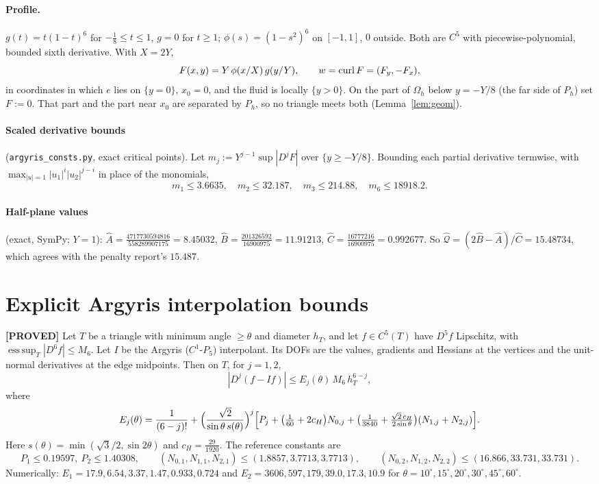 \documentclass[11pt]{article}
\theoremstyle{remark}\newtheorem{remark}[theorem]{Remark}
\newcommand{\Oh}{\Omega_h}\newcommand{\Gh}{\Gamma_h}\newcommand{\hG}{h_\Gamma}\newcommand{\dn}{\partial_n}
\newcommand{\lab}[1]{\textbf{[#1]}}
\begin{document}
\paragraph{Profile.} $g(t)=t(1-t)^6$ for $-\tfrac18\le t\le1$, $g=0$ for $t\ge1$; $\phi(s)=(1-s^2)^6$ on $[-1,1]$, $0$ outside.
Both are $C^5$ with piecewise-polynomial, bounded sixth derivative. With $X=2Y$,
\[F(x,y)=Y\,\phi(x/X)\,g(y/Y),\qquad w=\operatorname{curl} F=(F_y,-F_x),\]
in coordinates in which $e$ lies on $\{y=0\}$, $x_0=0$, and the fluid is locally $\{y>0\}$. On the part of $\Oh$ below
$y=-Y/8$ (the far side of $P_h$) set $F:=0$. That part and the part near $x_0$ are separated by $P_h$, so no triangle meets
both (Lemma~\ref{lem:geom}).

\paragraph{Scaled derivative bounds} (\texttt{argyris\_consts.py}, exact critical points). Let
$m_j:=Y^{j-1}\sup|D^jF|$ over $\{y\ge-Y/8\}$. Bounding each partial derivative termwise, with
$\max_{|u|=1}|u_1|^i|u_2|^{j-i}$ in place of the monomials,
\[m_1\le3.6635,\quad m_2\le32.187,\quad m_3\le214.88,\quad m_6\le18918.2 .\]
\paragraph{Half-plane values} (exact, SymPy; $Y=1$):
$\hat A=\tfrac{4717730594816}{558289907175}=8.45032$, $\hat B=\tfrac{201326592}{16900975}=11.91213$,
$\hat C=\tfrac{16777216}{16900975}=0.992677$. So $\hat{\mathcal Q}=(2\hat B-\hat A)/\hat C=15.48734$, which agrees with the
penalty report's $15.487$.

\section{Explicit Argyris interpolation bounds}
\begin{lemma}\label{lem:arg}\lab{PROVED}
Let $T$ be a triangle with minimum angle $\ge\theta$ and diameter $h_T$, and let $f\in C^5(T)$ have $D^5f$ Lipschitz, with
$\operatorname{ess\,sup}_T|D^6f|\le M_6$. Let $I$ be the Argyris ($C^1$-$P_5$) interpolant. Its DOFs are the values,
gradients and Hessians at the vertices and the unit-normal derivatives at the edge midpoints. Then on $T$, for $j=1,2$,
\[|D^j(f-If)|\le E_j(\theta)\,M_6\,h_T^{6-j},\]
where
\[E_j(\theta)=\frac1{(6-j)!}+\Bigl(\frac{\sqrt2}{\sin\theta\,s(\theta)}\Bigr)^{j}\Bigl[P_j+\bigl(\tfrac1{60}+2c_H\bigr)N_{0,j}
+\bigl(\tfrac1{3840}+\tfrac{\sqrt2\,c_H}{2\sin\theta}\bigr)(N_{1,j}+N_{2,j})\Bigr].\]
Here $s(\theta)=\min(\sqrt3/2,\sin2\theta)$ and $c_H=\tfrac{29}{1920}$. The reference constants are
\[P_1\le0.19597,\ P_2\le1.40308,\qquad (N_{0,1},N_{1,1},N_{2,1})\le(1.8857,3.7713,3.7713),\qquad
(N_{0,2},N_{1,2},N_{2,2})\le(16.866,33.731,33.731).\]
Numerically: $E_1=17.9,6.54,3.37,1.47,0.933,0.724$ and $E_2=3606,597,179,39.0,17.3,10.9$ for
$\theta=10^\circ,15^\circ,20^\circ,30^\circ,45^\circ,60^\circ$.
\end{lemma}
\end{document}
